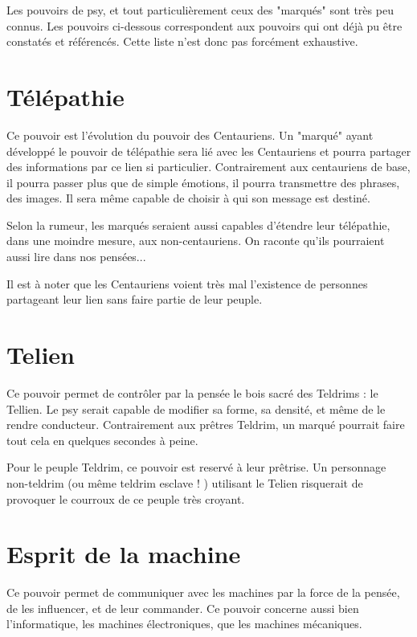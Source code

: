 \begin{multicols*}{2}

Les pouvoirs de psy, et tout particulièrement ceux des "marqués" sont très peu connus. Les pouvoirs ci-dessous correspondent aux pouvoirs qui ont déjà pu être constatés et référencés. Cette liste n'est donc pas forcément exhaustive.

\section{Télépathie}

Ce pouvoir est l'évolution du pouvoir des Centauriens. Un "marqué" ayant développé le pouvoir de télépathie sera lié avec les Centauriens et pourra partager des informations par ce lien si particulier. Contrairement aux centauriens de base, il pourra passer plus que de simple émotions, il pourra transmettre des phrases, des images. Il sera même capable de choisir à qui son message est destiné.

Selon la rumeur, les marqués seraient aussi capables d'étendre leur télépathie, dans une moindre mesure, aux non-centauriens. On raconte qu'ils pourraient aussi lire dans nos pensées...

Il est à noter que les Centauriens voient très mal l'existence de personnes partageant leur lien sans faire partie de leur peuple.

\section{Telien}

Ce pouvoir permet de contrôler par la pensée le bois sacré des Teldrims : le Tellien. Le psy serait capable de modifier sa forme, sa densité, et même de le rendre conducteur. Contrairement aux prêtres Teldrim, un marqué pourrait faire tout cela en quelques secondes à peine.

Pour le peuple Teldrim, ce pouvoir est reservé à leur prêtrise. Un personnage non-teldrim (ou même teldrim esclave ! ) utilisant le Telien risquerait de provoquer le courroux de ce peuple très croyant.

\section{Esprit de la machine}

Ce pouvoir permet de communiquer avec les machines par la force de la pensée, de les influencer, et de leur commander. Ce pouvoir concerne aussi bien l'informatique, les machines électroniques, que les machines mécaniques.


\end{multicols*}
